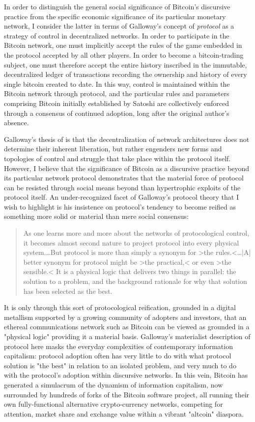 In order to distinguish the general social significance of Bitcoin's discursive practice from the specific economic significance of its particular monetary network, I consider the latter in terms of Galloway's concept of \emph{protocol} as a strategy of control in decentralized networks. In order to participate in the Bitcoin network, one must implicitly accept the rules of the game embedded in the protocol accepted by all other players. In order to become a bitcoin-trading subject, one must therefore accept the entire history inscribed in the immutable, decentralized ledger of transactions recording the ownership and history of every single bitcoin created to date. In this way, control is maintained within the Bitcoin network through protocol, and the particular rules and parameters comprising Bitcoin initially established by Satoshi are collectively enforced through a consensus of continued adoption, long after the original author's absence.

Galloway's thesis of  is that the decentralization of network architectures does not determine their inherent liberation, but rather engenders new forms and topologies of control and struggle that take place within the protocol itself. However, I believe that the significance of Bitcoin as a discursive practice beyond its particular network protocol demonstrates that the material force of protocol can be resisted through social means beyond than hypertrophic exploits of the protocol itself. An under-recognized facet of Galloway's protocol theory that I wish to highlight is his insistence on protocol's tendency to become reified as something more solid or material than mere social consensus:
\blockquote{
  As one learns more and more about the networks of protocological control, it becomes almost second nature to project protocol into every physical system.…But protocol is more than simply a synonym for >the rules.<…|A| better synonym for protocol might be >the practical,< or even >the sensible.< It is a physical logic that delivers two things in parallel: the solution to a problem, and the background rationale for why that solution has been selected as the best. \autocite*[244--5]{Galloway2004-ac}
}
It is only through this sort of protocological reification, grounded in a digital metallism supported by a growing community of adopters and investors, that an ethereal communications network such as Bitcoin can be viewed as grounded in a "physical logic" providing it a material basis. Galloway's materialist description of protocol here masks the everyday complexities of contemporary information capitalism: protocol adoption often has very little to do with what protocol solution is "the best" in relation to an isolated problem, and very much to do with the protocol's adoption within discursive networks. In this vein, Bitcoin has generated a simulacrum of the dynamism of information capitalism, now surrounded by hundreds of forks of the Bitcoin software project, all running their own fully-functional alternative crypto-currency networks, competing for attention, market share and exchange value within a vibrant "altcoin" diaspora.

